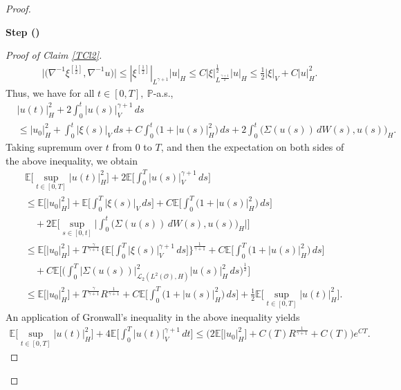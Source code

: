\documentclass[english,a4paper,11pt]{amsart}
\theoremstyle{plain}
\theoremstyle{definition}
\theoremstyle{remark}
\numberwithin{equation}{section}
\newcounter{lil1}
\newenvironment{step}
{\begin{list} { \bf Step (\Roman{lil1})}
		{ \usecounter{lil1}
			\setlength{\leftmargin}{0.0cm}
			\setlength{\topsep}{0.2cm}
			\setlength{\itemsep}{0.0cm}
			\setlength{\parsep}{0.1cm}
			\setlength{\itemindent}{0.8cm}
			\setlength{\parskip}{0.0cm}}}
	{\end{list}}
\newcounter{lil33}
\newcounter{lil1q}
\newcommand{\CO}{{{ \mathcal O }}}
\newcommand{\EE}{ \mathbb{E} }
\renewcommand{\P}{\mathbb{P}}
\begin{document}
\begin{proof}
\begin{step}
\begin{proof}[Proof of Claim \ref{TCl2}]
\begin{align*}
	\big|\big(\nabla^{-1}\xi^{[\frac{1}{2}]}, \nabla^{-1}u\big)\big| \leq  | \xi^{[\frac{1}{2}]} | _{L^{\gamma+1}} | u | _H \leq C  | \xi | _{L^\frac{\gamma+1}{2}}^\frac{1}{2} | u | _H \leq \frac{1}{2} | \xi | _{V}+C | u | _H^2.  
\end{align*}Thus, we have for all $t\in[0,T], \ \P$-a.s., 
\begin{align*}
	&	 | u(t) | _{H}^2 +2 \int_0^t | u(s) | _V^{\gamma+1}\,ds 
	\\&\leq 	 | u_0 | _{H}^2+\int_0^t  | \xi(s) | _V\,ds +C\int_0^t\big(1+ | u(s) | _H^2)\,ds+ 2\int_0^t \big(\Sigma(u(s))\, dW(s),u(s)\big)_H.
\end{align*}Taking supremum over $t$ from $0$ to $T$, and then the expectation on both sides of the above inequality, we obtain 
\begin{align*}
	&\EE\bigg[\sup_{t\in[0,T]}	 | u(t) | _{H}^2\bigg] +2 \EE\bigg[\int_0^T | u(s) | _V^{\gamma+1}\,ds\bigg] 
	\\&\leq \EE\Big[	 | u_0 | _{H}^2\Big]+\EE\bigg[\int_0^T  | \xi(s) | _V\,ds\bigg] +C\EE\bigg[\int_0^T\big(1+ | u(s) | _H^2)\,ds\bigg]\\&\quad + 2\EE\bigg[\sup_{s\in[0,t]}\bigg|\int_0^t \big(\Sigma(u(s))\, dW(s),u(s)\big)_H\bigg|\bigg]
		\\&\leq \EE\Big[	 | u_0 | _{H}^2\Big]+T^{\frac{\gamma}{\gamma+1}}\bigg\{\EE\bigg[\int_0^T  | \xi(s) | _V^{\gamma+1}\,ds\bigg]\bigg\}^\frac{1}{\gamma+1} +C\EE\bigg[\int_0^T\big(1+ | u(s) | _H^2)\,ds\bigg]\\&\quad + C\EE\bigg[\bigg(\int_0^T  | \Sigma(u(s)) | _{\mathcal{L}_2(L^2(\CO),H)}^2 | u(s) | _H^2\,ds\bigg)^\frac{1}{2}\bigg]
			\\&\leq \EE\Big[	 | u_0 | _{H}^2\Big]+T^{\frac{\gamma}{\gamma+1}}R^\frac{1}{\gamma+1} +C\EE\bigg[\int_0^T\big(1+ | u(s) | _H^2)\,ds\bigg] + \frac{1}{2}\EE\bigg[\sup_{t\in[0,T]}  | u(t) | _{H}^2\bigg].
\end{align*}An application of Gronwall's inequality in the above inequality yields
\begin{align*}
	\EE\bigg[\sup_{t\in[0,T]}	 | u(t) | _{H}^2\bigg] +4\EE\bigg[\int_0^T | u(t) | _V^{\gamma+1}\,dt\bigg] \leq \Big(2\EE\Big[	 | u_0 | _{H}^2\Big]+C(T)R^\frac{1}{\gamma+1}+C(T)\Big)e^{CT}.
\end{align*} 
\end{proof}




\end{step}
\end{proof}
\end{document}
